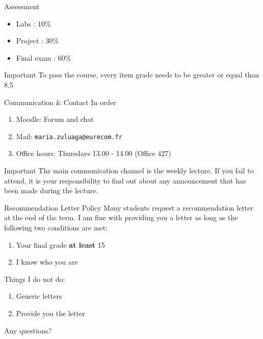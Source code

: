 \documentclass[aspectratio=169,10pt]{beamer}
\begin{document}
\begin{frame}{Assessment}
	\begin{itemize}
		\item Labs : 10\%
		\item Project : 30\%
		\item Final exam : 60\%
	\end{itemize}
	
	\begin{block}{Important}
		To pass the course, every item grade needs to be greater or equal than 8.5
	\end{block}
\end{frame}

\begin{frame}[fragile]{Communication \& Contact}
	In order
	\begin{enumerate}
		\item Moodle: Forum and chat
		\item Mail: \verb|maria.zuluaga@eurecom.fr|
		\item Office hours: Thursdays 13.00 - 14.00 (Office 427)
	\end{enumerate}
	\begin{block}{Important}
		The main communication channel is the weekly lecture. If you fail to attend, it is your responsibility to find out about any announcement that has been made during the lecture.
	\end{block}
\end{frame}

\begin{frame}{Recommendation Letter Policy}
	Many students request a recommendation letter at the end of the term. I am fine with providing you a letter as long as the following two conditions are met:
	\begin{enumerate}
		\item Your final grade \textbf{at least} 15
		\item I know who you are
	\end{enumerate}

	Things I do not do:
	\begin{enumerate}
		\item Generic letters
		\item Provide you the letter
	\end{enumerate}
\end{frame}


	
\begin{frame}[t,standout]
	\Large
	Any questions?
\end{frame}
\end{document}

